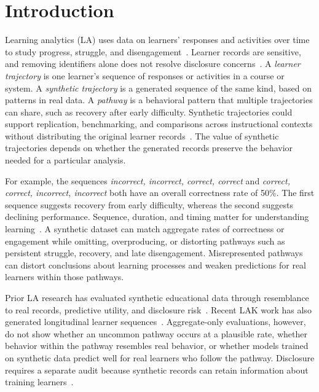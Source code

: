 \documentclass[fleqn,10pt]{JLA_article}
\begin{document}
\raggedbottom
\maketitle
\thispagestyle{fancy}

\section{Introduction}

Learning analytics (LA) uses data on learners' responses and activities over time to study progress, struggle, and disengagement~\cite{siemens2013emergence,knight2017time,molenaar2014sequential}. Learner records are sensitive, and removing identifiers alone does not resolve disclosure concerns~\cite{slade2013ethics,liu2023understanding}. A \emph{learner trajectory} is one learner's sequence of responses or activities in a course or system. A \emph{synthetic trajectory} is a generated sequence of the same kind, based on patterns in real data. A \emph{pathway} is a behavioral pattern that multiple trajectories can share, such as recovery after early difficulty. Synthetic trajectories could support replication, benchmarking, and comparisons across instructional contexts without distributing the original learner records~\cite{haim2023openscience,gasevic2016context}. The value of synthetic trajectories depends on whether the generated records preserve the behavior needed for a particular analysis.

For example, the sequences \emph{incorrect, incorrect, correct, correct} and \emph{correct, correct, incorrect, incorrect} both have an overall correctness rate of 50\%. The first sequence suggests recovery from early difficulty, whereas the second suggests declining performance. Sequence, duration, and timing matter for understanding learning~\cite{knight2017time,molenaar2014sequential,saint2020combining}. A synthetic dataset can match aggregate rates of correctness or engagement while omitting, overproducing, or distorting pathways such as persistent struggle, recovery, and late disengagement. Misrepresented pathways can distort conclusions about learning processes and weaken predictions for real learners within those pathways.

Prior LA research has evaluated synthetic educational data through resemblance to real records, predictive utility, and disclosure risk~\cite{liu2024scaling,liu2025fairprivate}. Recent LAK work has also generated longitudinal learner sequences~\cite{huang2026pathways}. Aggregate-only evaluations, however, do not show whether an uncommon pathway occurs at a plausible rate, whether behavior within the pathway resembles real behavior, or whether models trained on synthetic data predict well for real learners who follow the pathway. Disclosure requires a separate audit because synthetic records can retain information about training learners~\cite{stadler2022synthetic,vanbreugel2023membership}.
\end{document}
